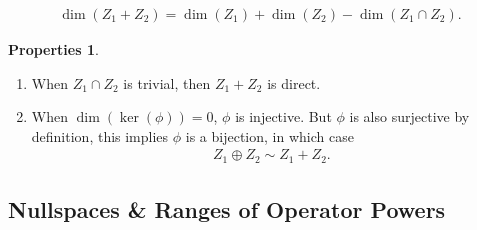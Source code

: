 \documentclass{article}
\theoremstyle{definition}
\newtheorem{prop}{Properties}[section]
\begin{document}
\begin{align*}
\dim(Z_1 + Z_2) = \dim(Z_1) + \dim(Z_2) - \dim(Z_1\cap Z_2).
\end{align*}
\begin{prop}
	$\,$
	\begin{enumerate}
		\item When $Z_1\cap Z_2$ is trivial, then $Z_1 + Z_2$ is direct. 
		\item When $\dim(\ker(\phi)) = 0$, $\phi$ is injective. But $\phi$ is also surjective by definition, this implies $\phi$ is a bijection, in which case
		\begin{align*}
		Z_1 \oplus Z_2 \sim Z_1 + Z_2.
		\end{align*} 
	\end{enumerate}
\end{prop}


\subsection{Nullspaces \& Ranges of Operator Powers}
\end{document}
